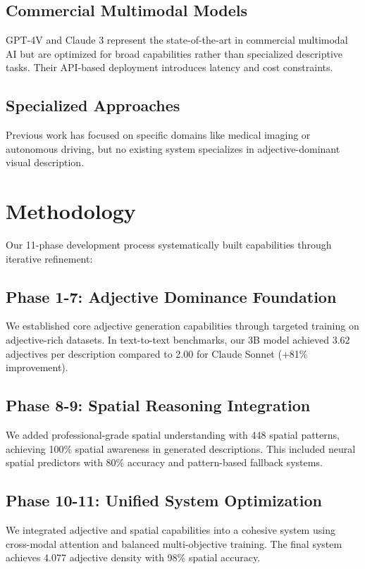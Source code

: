 \documentclass[10pt]{article}
\begin{document}
\subsection{Commercial Multimodal Models}
GPT-4V \cite{openai2023gpt4} and Claude 3 \cite{anthropic2024claude} represent the state-of-the-art in commercial multimodal AI but are optimized for broad capabilities rather than specialized descriptive tasks. Their API-based deployment introduces latency and cost constraints.

\subsection{Specialized Approaches}
Previous work has focused on specific domains like medical imaging or autonomous driving, but no existing system specializes in adjective-dominant visual description.

\section{Methodology}

Our 11-phase development process systematically built capabilities through iterative refinement:

\subsection{Phase 1-7: Adjective Dominance Foundation}
We established core adjective generation capabilities through targeted training on adjective-rich datasets. In text-to-text benchmarks, our 3B model achieved 3.62 adjectives per description compared to 2.00 for Claude Sonnet (+81\% improvement).

\subsection{Phase 8-9: Spatial Reasoning Integration}  
We added professional-grade spatial understanding with 448 spatial patterns, achieving 100\% spatial awareness in generated descriptions. This included neural spatial predictors with 80\% accuracy and pattern-based fallback systems.

\subsection{Phase 10-11: Unified System Optimization}
We integrated adjective and spatial capabilities into a cohesive system using cross-modal attention and balanced multi-objective training. The final system achieves 4.077 adjective density with 98\% spatial accuracy.
\end{document}
